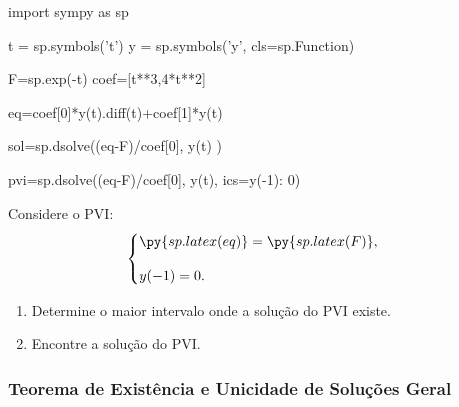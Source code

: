 \begin{frame}[fragile=singleslide]
\begin{pycode} 
import sympy as sp


t = sp.symbols('t')
y = sp.symbols('y', cls=sp.Function)

F=sp.exp(-t)
coef=[t**3,4*t**2]

eq=coef[0]*y(t).diff(t)+coef[1]*y(t)

sol=sp.dsolve((eq-F)/coef[0], y(t) )

pvi=sp.dsolve((eq-F)/coef[0], y(t), ics={y(-1): 0})
\end{pycode} 

\begin{exe}
 Considere o PVI:
\[
\begin{cases}
\displaystyle\py{sp.latex(eq)}=\py{sp.latex(F)},\\[1em]
y(-1)=0.
\end{cases}
\]

\begin{enumerate}

\item  Determine o maior intervalo onde a solução do PVI existe.

\item  Encontre a solução do PVI.
\end{enumerate}
\end{exe}
\end{frame}

\begin{frame}
\frametitle{Teorema de Existência e Unicidade de Soluções Geral}



\end{frame}





